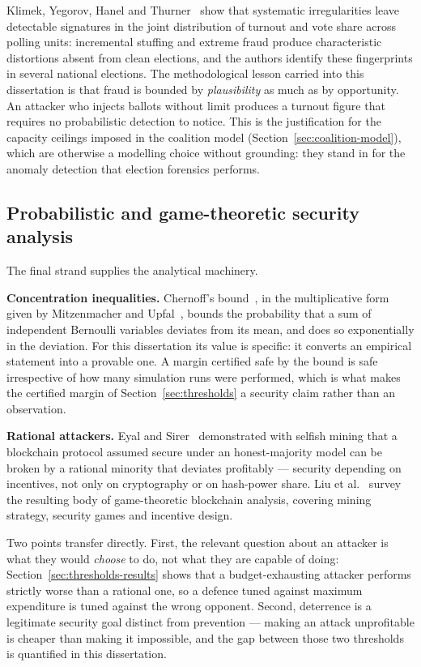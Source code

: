 Klimek, Yegorov, Hanel and Thurner~\cite{klimek2012} show that
systematic irregularities leave detectable signatures in the joint
distribution of turnout and vote share across polling units: incremental
stuffing and extreme fraud produce characteristic distortions absent
from clean elections, and the authors identify these fingerprints in
several national elections. The methodological lesson carried into this
dissertation is that fraud is bounded by \emph{plausibility} as much as
by opportunity. An attacker who injects ballots without limit produces a
turnout figure that requires no probabilistic detection to notice. This
is the justification for the capacity ceilings imposed in the coalition
model (Section~\ref{sec:coalition-model}), which are otherwise a
modelling choice without grounding: they stand in for the anomaly
detection that election forensics performs.

\subsection{Probabilistic and game-theoretic security analysis}
\label{sec:lit-probgame}

The final strand supplies the analytical machinery.

\textbf{Concentration inequalities.} Chernoff's
bound~\cite{chernoff1952}, in the multiplicative form given by
Mitzenmacher and Upfal~\cite{mitzenmacher2017}, bounds the probability
that a sum of independent Bernoulli variables deviates from its mean,
and does so exponentially in the deviation. For this dissertation its
value is specific: it converts an empirical statement into a provable
one. A margin certified safe by the bound is safe irrespective of how
many simulation runs were performed, which is what makes the certified
margin of Section~\ref{sec:thresholds} a security claim rather than an
observation.

\textbf{Rational attackers.} Eyal and Sirer~\cite{eyal2014}
demonstrated with selfish mining that a blockchain protocol assumed
secure under an honest-majority model can be broken by a rational
minority that deviates profitably --- security depending on incentives,
not only on cryptography or on hash-power share. Liu et
al.~\cite{liu2019} survey the resulting body of game-theoretic
blockchain analysis, covering mining strategy, security games and
incentive design.

Two points transfer directly. First, the relevant question about an
attacker is what they would \emph{choose} to do, not what they are
capable of doing: Section~\ref{sec:thresholds-results} shows that a
budget-exhausting attacker performs strictly worse than a rational one,
so a defence tuned against maximum expenditure is tuned against the
wrong opponent. Second, deterrence is a legitimate security goal
distinct from prevention --- making an attack unprofitable is cheaper
than making it impossible, and the gap between those two thresholds is
quantified in this dissertation.

